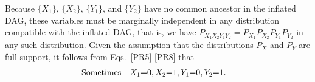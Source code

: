 Because $\{X_1\}$, $\{X_2\}$, $\{Y_1\}$, and $\{Y_2\}$ have no common ancestor in the inflated DAG, these variables must be marginally independent in any distribution compatible with the inflated DAG,  that is, we have $P_{X_1 X_2 Y_1 Y_2} = P_{X_1} P_{X_2} P_{Y_1} P_{Y_2}$ in any such distribution.   Given the assumption that the distributions $P_{X}$ and $P_{Y}$ are full support, it follows from Eqs.~\eqref{PR5}-\eqref{PR8} that
\begin{align}\label{PRs}
\text{Sometimes} \quad &X_1 \mathord{=} 0, X_2 \mathord{=}1, Y_1 \mathord{=} 0, Y_2 \mathord{=} 1.
\end{align} 

